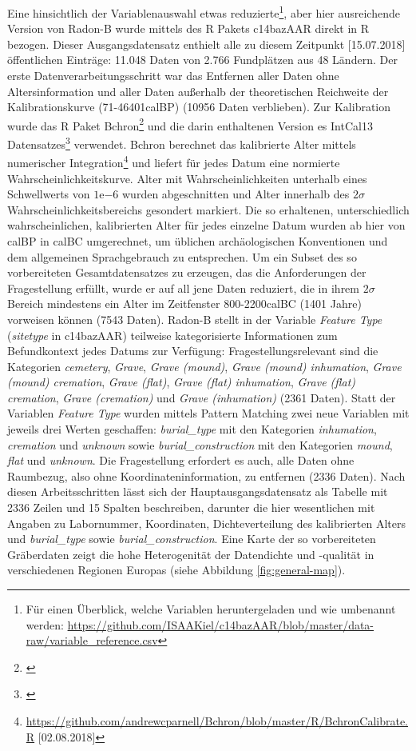 \documentclass[openany,twoside,twocolumn]{book}
\let\rmarkdownfootnote\footnote%
\def\footnote{\protect\rmarkdownfootnote}
\begin{document}
Eine hinsichtlich der Variablenauswahl etwas reduzierte\footnote{Für
  einen Überblick, welche Variablen heruntergeladen und wie umbenannt
  werden:
  \url{https://github.com/ISAAKiel/c14bazAAR/blob/master/data-raw/variable_reference.csv}},
aber hier ausreichende Version von Radon-B wurde mittels des R Pakets
c14bazAAR direkt in R bezogen. Dieser Ausgangsdatensatz enthielt alle zu
diesem Zeitpunkt {[}15.07.2018{]} öffentlichen Einträge: 11.048 Daten
von 2.766 Fundplätzen aus 48 Ländern. Der erste
Datenverarbeitungsschritt war das Entfernen aller Daten ohne
Altersinformation und aller Daten außerhalb der theoretischen Reichweite
der Kalibrationskurve (71-46401calBP) (10956 Daten verblieben). Zur
Kalibration wurde das R Paket Bchron\footnote{\textcite{haslett_simple_2008}}
und die darin enthaltenen Version es IntCal13 Datensatzes\footnote{\textcite{reimer_intcal13_2013}}
verwendet. Bchron berechnet das kalibrierte Alter mittels numerischer
Integration\footnote{\url{https://github.com/andrewcparnell/Bchron/blob/master/R/BchronCalibrate.R}
  {[}02.08.2018{]}} und liefert für jedes Datum eine normierte
Wahrscheinlichkeitskurve. Alter mit Wahrscheinlichkeiten unterhalb eines
Schwellwerts von \(1\mathrm{e}{-6}\) wurden abgeschnitten und Alter
innerhalb des \(2\sigma\) Wahrscheinlichkeitsbereichs gesondert
markiert. Die so erhaltenen, unterschiedlich wahrscheinlichen,
kalibrierten Alter für jedes einzelne Datum wurden ab hier von calBP in
calBC umgerechnet, um üblichen archäologischen Konventionen und dem
allgemeinen Sprachgebrauch zu entsprechen. Um ein Subset des so
vorbereiteten Gesamtdatensatzes zu erzeugen, das die Anforderungen der
Fragestellung erfüllt, wurde er auf all jene Daten reduziert, die in
ihrem \(2\sigma\) Bereich mindestens ein Alter im Zeitfenster
800-2200calBC (1401 Jahre) vorweisen können (7543 Daten). Radon-B stellt
in der Variable \emph{Feature Type} (\emph{sitetype} in c14bazAAR)
teilweise kategorisierte Informationen zum Befundkontext jedes Datums
zur Verfügung: Fragestellungsrelevant sind die Kategorien
\emph{cemetery}, \emph{Grave}, \emph{Grave (mound)}, \emph{Grave (mound)
inhumation}, \emph{Grave (mound) cremation}, \emph{Grave (flat)},
\emph{Grave (flat) inhumation}, \emph{Grave (flat) cremation},
\emph{Grave (cremation)} und \emph{Grave (inhumation)} (2361 Daten).
Statt der Variablen \emph{Feature Type} wurden mittels Pattern Matching
zwei neue Variablen mit jeweils drei Werten geschaffen:
\emph{burial\_type} mit den Kategorien \emph{inhumation},
\emph{cremation} und \emph{unknown} sowie \emph{burial\_construction}
mit den Kategorien \emph{mound}, \emph{flat} und \emph{unknown}. Die
Fragestellung erfordert es auch, alle Daten ohne Raumbezug, also ohne
Koordinateninformation, zu entfernen (2336 Daten). Nach diesen
Arbeitsschritten lässt sich der Hauptausgangsdatensatz als Tabelle mit
2336 Zeilen und 15 Spalten beschreiben, darunter die hier wesentlichen
mit Angaben zu Labornummer, Koordinaten, Dichteverteilung des
kalibrierten Alters und \emph{burial\_type} sowie
\emph{burial\_construction}. Eine Karte der so vorbereiteten Gräberdaten
zeigt die hohe Heterogenität der Datendichte und -qualität in
verschiedenen Regionen Europas (siehe Abbildung \ref{fig:general-map}).
\end{document}
